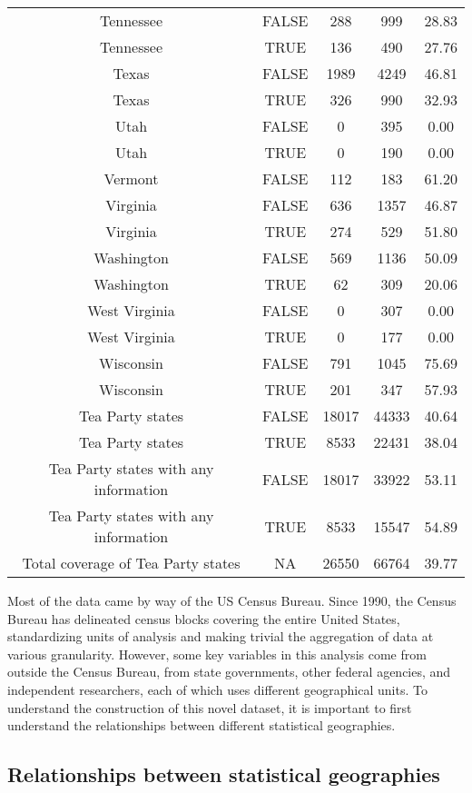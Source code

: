 \documentclass[
]{article}
\begin{document}
\begin{longtable}[t]{ccccc}
Tennessee & FALSE & 288 & 999 & 28.83\\
\addlinespace
Tennessee & TRUE & 136 & 490 & 27.76\\
Texas & FALSE & 1989 & 4249 & 46.81\\
Texas & TRUE & 326 & 990 & 32.93\\
Utah & FALSE & 0 & 395 & 0.00\\
Utah & TRUE & 0 & 190 & 0.00\\
\addlinespace
Vermont & FALSE & 112 & 183 & 61.20\\
Virginia & FALSE & 636 & 1357 & 46.87\\
Virginia & TRUE & 274 & 529 & 51.80\\
Washington & FALSE & 569 & 1136 & 50.09\\
Washington & TRUE & 62 & 309 & 20.06\\
\addlinespace
West Virginia & FALSE & 0 & 307 & 0.00\\
West Virginia & TRUE & 0 & 177 & 0.00\\
Wisconsin & FALSE & 791 & 1045 & 75.69\\
Wisconsin & TRUE & 201 & 347 & 57.93\\
Tea Party states & FALSE & 18017 & 44333 & 40.64\\
\addlinespace
Tea Party states & TRUE & 8533 & 22431 & 38.04\\
Tea Party states with any information & FALSE & 18017 & 33922 & 53.11\\
Tea Party states with any information & TRUE & 8533 & 15547 & 54.89\\
Total coverage of Tea Party states & NA & 26550 & 66764 & 39.77\\*
\end{longtable}

Most of the data came by way of the US Census Bureau.
Since 1990, the Census Bureau has delineated census blocks covering the entire United States, standardizing units of analysis and making trivial the aggregation of data at various granularity.
However, some key variables in this analysis come from outside the Census Bureau, from state governments, other federal agencies, and independent researchers, each of which uses different geographical units.
To understand the construction of this novel dataset, it is important to first understand the relationships between different statistical geographies.

\hypertarget{census-geography}{%
\subsection{Relationships between statistical geographies}\label{census-geography}}
\end{document}
